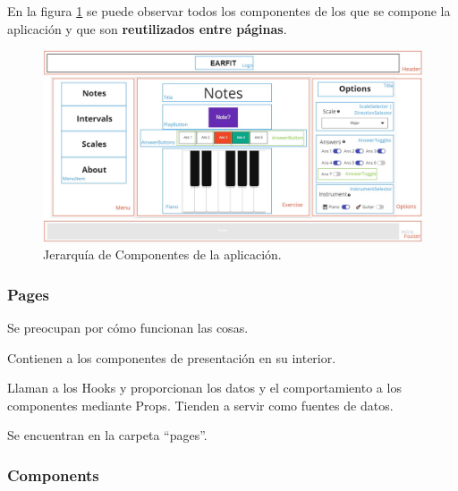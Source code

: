 \documentclass[12pt,twoside,titlepage]{report}
\begin{document}
En la figura \ref{fig:JerarquiaComponentes} se puede observar todos los componentes de los que se compone la aplicación y que son \textbf{reutilizados entre páginas}.

\begin{figure}[H]
    \centering
    \includegraphics[scale=0.28]{Detalles de Implementación/JerarquíaComponentes}
    \caption{Jerarquía de Componentes de la aplicación.}
    \label{fig:JerarquiaComponentes}
\end{figure}

\subsubsection{Pages}

\begin{compactitem}
    \item Se preocupan por cómo funcionan las cosas.
    \item Contienen a los componentes de presentación en su interior.
    \item Llaman a los Hooks y proporcionan los datos y el comportamiento a los componentes mediante Props. Tienden a servir como fuentes de datos.
    \item Se encuentran en la carpeta ``pages''. %
\end{compactitem}

\subsubsection{Components}
\end{document}
